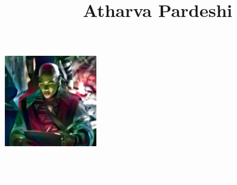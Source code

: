 \documentclass[11pt, oneside, a4paper, titlepage]{article}
\title{Atharva Pardeshi}
\date{}
\begin{document}
\begin{tcolorbox}
  \begin{minipage}{4.5cm}
    \hspace*{-0.2cm}\includegraphics[width=4cm]{spooky-sazed.png}
  \end{minipage}
  \begin{minipage}{15cm}
    \begin{center}
      \Huge{\textcolor{white}{Atharva Pardeshi}} \\
      \vspace*{0.5cm}
      \Large{\textcolor{white}{\emph{Software Developer}}}
    \end{center}
  \end{minipage}
\end{tcolorbox}
\end{document}
